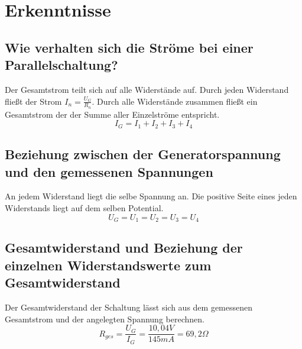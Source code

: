 \documentclass[
a4paper,     %
 headsepline, %
11pt         %
]{scrartcl}  %
\begin{document}
\section{Erkenntnisse}

\subsection{Wie verhalten sich die Ströme bei einer Parallelschaltung?}
Der Gesamtstrom teilt sich auf alle Widerstände auf. Durch jeden Widerstand fließt der Strom $I_n=\frac{U_G}{R_n}$.
Durch alle Widerstände zusammen fließt ein Gesamtstrom der der Summe aller Einzelströme entspricht.
\[I_G = I_1 + I_2 + I_3 + I_4\]

\subsection{Beziehung zwischen der Generatorspannung und den gemessenen Spannungen}
An jedem Widerstand liegt die selbe Spannung an. Die positive Seite eines jeden Widerstands liegt auf dem selben Potential.
\[U_G=U_1=U_2=U_3=U_4\]

\subsection{Gesamtwiderstand und Beziehung der einzelnen Widerstandswerte zum Gesamtwiderstand}
Der Gesamtwiderstand der Schaltung lässt sich aus dem gemessenen Gesamtstrom und der angelegten Spannung berechnen.
\[R_{ges} = \frac{U_G}{I_G} = \frac{10,04V}{145mA}= 69,2\Omega\]
\end{document}
